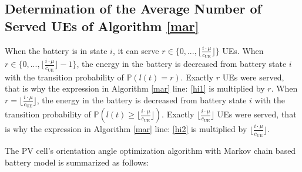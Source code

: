\subsection{Determination of the Average Number of Served UEs of Algorithm \ref{mar}}
When the battery is in state $i$, it can serve $r \in \{0,...,\Big\lfloor \frac{i\cdot\mu}{c_{\mathrm{UE}}} \Big\rfloor\}$ UEs. When $r\in\{0,...,\Big\lfloor \frac{i\cdot\mu}{c_{\mathrm{UE}}} \Big\rfloor   -1\}$, the energy in the battery is decreased from battery state $i$ with the transition probability of $\mathbb{P}(l(t)=r)$. Exactly $r$ UEs were served, that is why the expression in Algorithm \ref{mar} line: \ref{hi1} is multiplied by $r$. When $r= \Big\lfloor \frac{i\cdot\mu}{c_{\mathrm{UE}}} \Big\rfloor$, the energy in the battery is decreased from battery state $i$ with the transition probability of $\mathbb{P}(l(t)\geq \Big\lfloor \frac{i\cdot\mu}{c_{\mathrm{UE}}} \Big\rfloor) $. Exactly $\Big\lfloor \frac{i\cdot\mu}{c_{\mathrm{UE}}} \Big\rfloor$ UEs were served, that is why the expression in Algorithm \ref{mar} line: \ref{hi2} is multiplied by $\Big\lfloor \frac{i\cdot\mu}{c_{\mathrm{UE}}} \Big\rfloor$. 



The PV cell's orientation angle optimization algorithm with Markov chain based battery model is summarized as follows:


